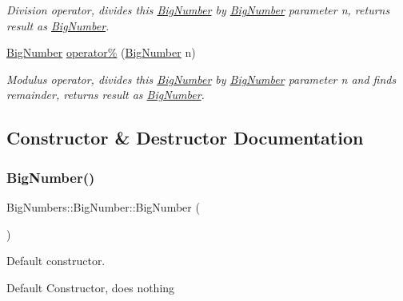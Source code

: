 \begin{DoxyCompactItemize}
\begin{DoxyCompactList}\small\item\em Division operator, divides this \mbox{\hyperlink{class_big_numbers_1_1_big_number}{Big\+Number}} by \mbox{\hyperlink{class_big_numbers_1_1_big_number}{Big\+Number}} parameter n, returns result as \mbox{\hyperlink{class_big_numbers_1_1_big_number}{Big\+Number}}. \end{DoxyCompactList}\item 
\mbox{\hyperlink{class_big_numbers_1_1_big_number}{Big\+Number}} \mbox{\hyperlink{class_big_numbers_1_1_big_number_a8d3ffbc2a02f11b1c429ab3184393c8c}{operator\%}} (\mbox{\hyperlink{class_big_numbers_1_1_big_number}{Big\+Number}} n)
\begin{DoxyCompactList}\small\item\em Modulus operator, divides this \mbox{\hyperlink{class_big_numbers_1_1_big_number}{Big\+Number}} by \mbox{\hyperlink{class_big_numbers_1_1_big_number}{Big\+Number}} parameter n and finds remainder, returns result as \mbox{\hyperlink{class_big_numbers_1_1_big_number}{Big\+Number}}. \end{DoxyCompactList}\end{DoxyCompactItemize}


\subsection{Constructor \& Destructor Documentation}
\mbox{\label{class_big_numbers_1_1_big_number_a5b76e86039ae97f38be80d5a0c04d2df}} 
\subsubsection{\texorpdfstring{BigNumber()}{BigNumber()}\hspace{0.1cm}{\footnotesize\ttfamily [1/2]}}
{\footnotesize\ttfamily Big\+Numbers\+::\+Big\+Number\+::\+Big\+Number (\begin{DoxyParamCaption}{ }\end{DoxyParamCaption})}



Default constructor. 

Default Constructor, does nothing \mbox{\label{class_big_numbers_1_1_big_number_a363386cd7d37e5955bb5ff84fb94828d}} 
